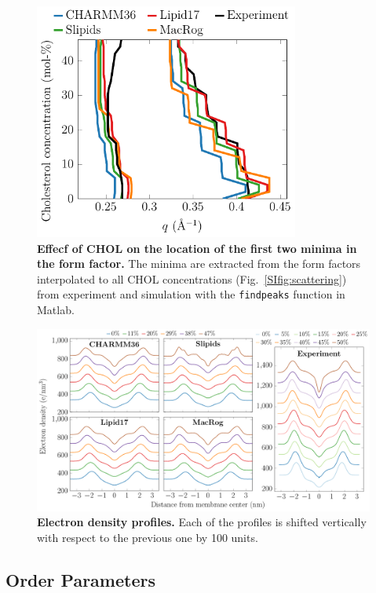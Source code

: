\documentclass[journal=jpcbfk]{achemso}
\begin{document}
\begin{figure}[htb!]
    \centering
    \includegraphics[width=8.7cm]{../FIGS/ffminima.pdf}
    \caption{\label{SIfig:ffminima}%
    \textbf{Effecf of CHOL on the location of the first two minima in the form factor.}
    The minima are extracted from the form factors interpolated to all CHOL concentrations (Fig.~\ref{SIfig:scattering}) from experiment and simulation with the \texttt{findpeaks} function in Matlab.
    }
\end{figure}

\begin{figure}[htb!]
    \centering
    \includegraphics[width=\linewidth]{../FIGS/densityprofiles.pdf}
    \caption{\label{SIfig:densprofs}%
    \textbf{Electron density profiles.}
    Each of the profiles is shifted vertically with respect to the previous one by 100 units.
    }
\end{figure}

\clearpage
\subsection{Order Parameters}
\end{document}
